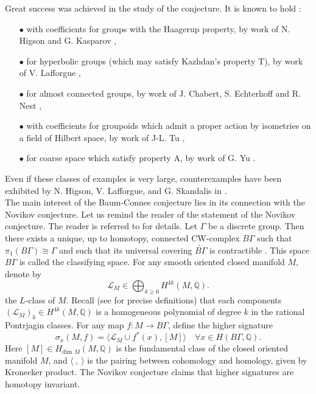 Great success was achieved in the study of the conjecture. It is known to hold :\\
\begin{itemize}
\item[$\bullet$] with coefficients for groups with the Haagerup property, by work of N. Higson and G. Kasparov \cite{higsonkasparov},
\item[$\bullet$] for hyperbolic groups (which may satisfy Kazhdan's property T), by work of V. Lafforgue \cite{Lafforgue}, 
\item[$\bullet$] for almost connected groups, by work of J. Chabert, S. Echterhoff and R. Nest \cite{chabertEN},
\item[$\bullet$] with coefficients for groupoids which admit a proper action by isometries on a field of Hilbert space, by work of J-L. Tu \cite{TuThese},
\item[$\bullet$] for coarse space which satisfy property A, by work of G. Yu \cite{Yu2}.\\
\end{itemize}  
Even if these classes of examples is very large, counterexamples have been exhibited by N. Higson, V. Lafforgue, and G. Skandalis in \cite{HigsonLaffSk}.\\

The main interest of the Baum-Connes conjecture lies in its connection with the Novikov conjecture. Let us remind the reader of the statement of the Novikov conjecture. The reader is referred to \cite{kreckluck} for details. Let $\Gamma$ be a discrete group. Then there exists a unique, up to homotopy, connected CW-complex $B\Gamma$ such that $\pi_1(B \Gamma) \cong \Gamma$ and such that its universal covering $\tilde{B\Gamma}$ is contractible \cite{May}. This space $B\Gamma$ is called the classifying space. For any smooth oriented closed manifold $M$, denote by \[\mathcal L_M \in \bigoplus_{k\geq 0} H^{4k}(M,\mathbb Q).\] the $L$-class of $M$. Recall (see \cite{kreckluck} for precise definitions) that each components $(\mathcal L_M)_k\in H^{4k}(M,\mathbb Q) $ is a homogeneous polynomial of degree $k$ in the rational Pontrjagin classes. For any map $f: M\rightarrow B\Gamma$, define the higher signature 
\[\sigma_x(M,f) = \langle \mathcal L_M \cup f^*(x),[M] \rangle \quad \forall x\in H(B\Gamma,\mathbb Q).\]
Here $[M]\in H_{\text{dim }M}(M,\mathbb Q)$ is the fundamental class of the closed oriented manifold $M$, and $\langle \ , \ \rangle $ is the pairing between cohomology and homology, given by Kronecker product. The Novikov conjecture claims that higher signatures are homotopy invariant.

